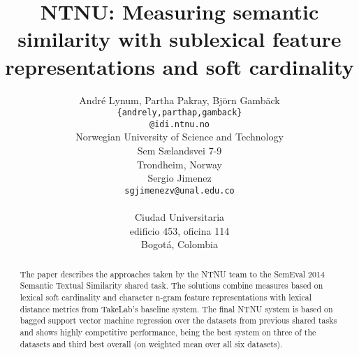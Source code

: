\documentclass[11pt]{article}
\title{NTNU: Measuring semantic similarity with sublexical feature representations and soft cardinality}
\author{Andr\'{e} Lynum, Partha Pakray, Bj\"{o}rn Gamb\"{a}ck\\
  {\tt \{andrely,parthap,gamback\}} \\
  {\tt  @idi.ntnu.no} \\
  Norwegian University of Science and Technology \\
  Sem S{\ae}landsvei 7-9 \\
  Trondheim, Norway \\
  \And
  Sergio Jimenez \\
  {\tt sgjimenezv@unal.edu.co}\\
  \\
  Ciudad Universitaria \\
  edificio 453, oficina 114\\
  Bogot{\' a}, Colombia \\
}
\date{}
\begin{document}
\maketitle

\begin{abstract}
The paper describes the approaches taken by the NTNU team
to the SemEval 2014  Semantic Textual Similarity  shared task.
The solutions combine measures based on lexical soft cardinality 
and character n-gram feature representations
with  lexical distance metrics from TakeLab's baseline system. 
The final NTNU system is based on bagged support vector machine regression
over the datasets from previous shared tasks and shows highly
competitive performance, being the
best  system on three of the datasets and third
best overall (on weighted mean over all six datasets).
\end{abstract}
















\end{document}
